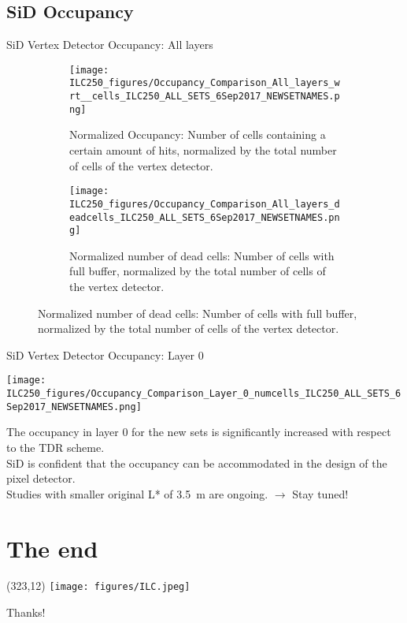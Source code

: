 \documentclass[xcolor={dvipsnames}]{beamer}
\newcommand{\ilclogo}{
  \setlength{\TPHorizModule}{1pt}
  \setlength{\TPVertModule}{1pt}
  \begin{textblock}{1}(323,12)
   \texttt{[image: figures/ILC.jpeg]}
  \end{textblock}
}
\begin{document}
\subsection{SiD Occupancy}
\begin{frame}{SiD Vertex Detector Occupancy: All layers}
 \begin{figure}
\centering
\begin{subfigure}[t]{0.48\textwidth}
\centering
\texttt{[image: ILC250\_figures/Occupancy\_Comparison\_All\_layers\_wrt\_\_cells\_ILC250\_ALL\_SETS\_6Sep2017\_NEWSETNAMES.png]}
\caption{\alert{Normalized Occupancy}: Number of cells containing a certain amount of hits, normalized by the total number of cells of the vertex detector.}
\end{subfigure}
\hspace*{0.2cm}
\begin{subfigure}[t]{0.48\textwidth}
\centering
\texttt{[image: ILC250\_figures/Occupancy\_Comparison\_All\_layers\_deadcells\_ILC250\_ALL\_SETS\_6Sep2017\_NEWSETNAMES.png]}
\caption{\alert{Normalized number of dead cells}: Number of cells with full buffer, normalized by the total number of cells of the vertex detector.}
\end{subfigure}
\end{figure}
\end{frame}

\begin{frame}{SiD Vertex Detector Occupancy: Layer 0}
\begin{center}
 \texttt{[image: ILC250\_figures/Occupancy\_Comparison\_Layer\_0\_numcells\_ILC250\_ALL\_SETS\_6Sep2017\_NEWSETNAMES.png]}
\end{center}
The occupancy in layer 0 for the new sets is significantly increased with respect to the TDR scheme.\\
SiD is confident that the occupancy can be accommodated in the design of the pixel detector.\\
Studies with smaller original L* of \SI{3.5}{\meter} are ongoing. $\rightarrow$ \alert{Stay tuned!}
\end{frame}



\section*{The end}
{
\begin{frame}
\ilclogo
\begin{center}
\textcolor{RubineRed}{
	\LARGE Thanks!\\
}
\end{center}
\end{frame}
}
\end{document}
